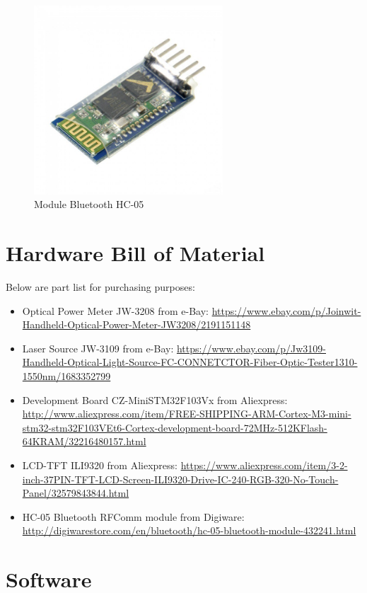 \documentclass[12pt,]{book}
\begin{document}
	\begin{figure}[h]
		\centering
		\includegraphics[width=200pt]{images/hc-05}
		\caption{Module Bluetooth HC-05}
	\end{figure}
	
	
	\section{Hardware Bill of Material}
	
	Below are part list for purchasing purposes:
	\begin{itemize}
		\item Optical Power Meter JW-3208 from e-Bay: \url{https://www.ebay.com/p/Joinwit-Handheld-Optical-Power-Meter-JW3208/2191151148}
		\item Laser Source JW-3109 from e-Bay: \url{https://www.ebay.com/p/Jw3109-Handheld-Optical-Light-Source-FC-CONNETCTOR-Fiber-Optic-Tester1310-1550nm/1683352799}
		\item Development Board CZ-MiniSTM32F103Vx from Aliexpress: \url{http://www.aliexpress.com/item/FREE-SHIPPING-ARM-Cortex-M3-mini-stm32-stm32F103VEt6-Cortex-development-board-72MHz-512KFlash-64KRAM/32216480157.html}
		\item LCD-TFT ILI9320 from Aliexpress: \url{https://www.aliexpress.com/item/3-2-inch-37PIN-TFT-LCD-Screen-ILI9320-Drive-IC-240-RGB-320-No-Touch-Panel/32579843844.html}
		\item HC-05 Bluetooth RFComm module from Digiware: \url{http://digiwarestore.com/en/bluetooth/hc-05-bluetooth-module-432241.html}
	\end{itemize}	  
	
	\section{Software}
	
\end{document}
